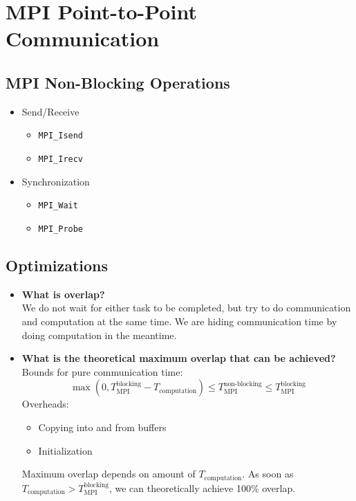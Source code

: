 \documentclass[9pt,pdftex]{beamer}
\begin{document}
\section{MPI Point-to-Point Communication}
\begin{frame}{\phantom{Contents}}
\tableofcontents[
  currentsection  
]
\end{frame}
\subsection{MPI Non-Blocking Operations}
\begin{frame}{\insertsubsection}
\begin{itemize}
	\item Send/Receive
	\begin{itemize}
	\item \lstinline[basicstyle=\scriptsize\bf]{MPI_Isend}
	\item \lstinline[basicstyle=\scriptsize\bf]{MPI_Irecv}
	\end{itemize}

	\item Synchronization
	\begin{itemize}
	\item \lstinline[basicstyle=\scriptsize\bf]{MPI_Wait}
	\item \lstinline[basicstyle=\scriptsize]{MPI_Probe}
	\end{itemize}
	
\end{itemize}
\end{frame}
\subsection{Optimizations}
\begin{frame}{\insertsubsection}
\begin{itemize}
\item \textbf{What is overlap?}\\
	We do not wait for either task to be completed, but try to do communication and computation at the same time. We are hiding communication time by doing computation in the meantime.
\item \textbf{What is the theoretical maximum overlap that can be achieved?}\\
Bounds for pure communication time: $$\max\left(0, T_\text{MPI}^\text{blocking} - T_\text{computation}\right) \leq T_\text{MPI}^\text{non-blocking} \leq T_\text{MPI}^\text{blocking}$$
Overheads:
\begin{itemize}
\item Copying into and from buffers
\item Initialization
\end{itemize}
Maximum overlap depends on amount of $T_\text{computation}$. As soon as $T_\text{computation}>T_\text{MPI}^\text{blocking}$, we can theoretically achieve 100\% overlap.

\end{itemize}

\end{frame}
\end{document}
